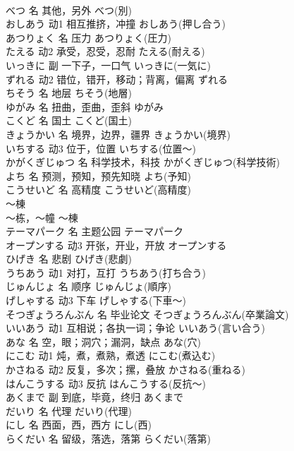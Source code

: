 \documentclass[8pt]{extreport}
\begin{document}
\begin{CJK}{UTF8}{min}
\\	べつ	名	其他，另外	べつ(別)	
\\	おしあう	动1	相互推挤，冲撞	おしあう(押し合う)	
\\	あつりょく	名	压力	あつりょく(圧力)	
\\	たえる	动2	承受，忍受，忍耐	たえる(耐える)	
\\	いっきに	副	一下子，一口气	いっきに(一気に)	
\\	ずれる	动2	错位，错开，移动；背离，偏离	ずれる	
\\	ちそう	名	地层	ちそう(地層)	
\\	ゆがみ	名	扭曲，歪曲，歪斜	ゆがみ	
\\	こくど	名	国土	こくど(国土)	
\\	きょうかい	名	境界，边界，疆界	きょうかい(境界)	
\\	いちする	动3	位于，位置	いちする(位置～)	
\\	かがくぎじゅつ	名	科学技术，科技	かがくぎじゅつ(科学技術)	
\\	よち	名	预测，预知，预先知晓	よち(予知)	
\\	こうせいど	名	高精度	こうせいど(高精度)	
\\	～棟	
\\	～栋，～幢	～棟	
\\	テーマパーク	名	主题公园	テーマパーク	
\\	オープンする	动3	开张，开业，开放	オープンする	
\\	ひげき	名	悲剧	ひげき(悲劇)	
\\	うちあう	动1	对打，互打	うちあう(打ち合う)	
\\	じゅんじょ	名	顺序	じゅんじょ(順序)	
\\	げしゃする	动3	下车	げしゃする(下車～)	
\\	そつぎょうろんぶん	名	毕业论文	そつぎょうろんぶん(卒業論文)	
\\	いいあう	动1	互相说；各执一词；争论	いいあう(言い合う)	
\\	あな	名	空，眼；洞穴；漏洞，缺点	あな(穴)	
\\	にこむ	动1	炖，煮，煮熟，煮透	にこむ(煮込む)	
\\	かさねる	动2	反复，多次；摞，叠放	かさねる(重ねる)	
\\	はんこうする	动3	反抗	はんこうする(反抗～)	
\\	あくまで	副	到底，毕竟，终归	あくまで	
\\	だいり	名	代理	だいり(代理)	
\\	にし	名	西面，西，西方	にし(西)	
\\	らくだい	名	留级，落选，落第	らくだい(落第)	

\end{CJK}
\end{document}
